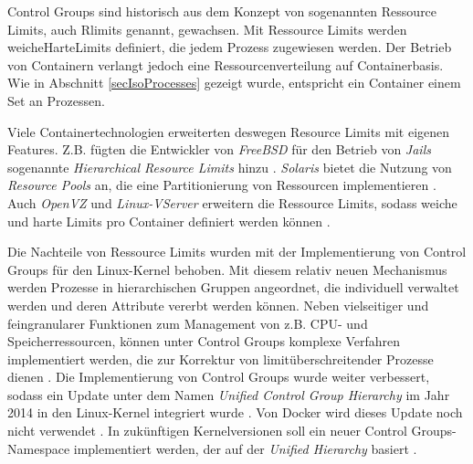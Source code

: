 \documentclass[../main.tex]{subfiles}
\begin{document}
		Control Groups sind historisch aus dem Konzept von sogenannten Ressource Limits, auch Rlimits genannt, gewachsen. Mit Ressource Limits werden \gls{weicheHarteLimits} definiert, die jedem Prozess zugewiesen werden. Der Betrieb von Containern verlangt jedoch eine Ressourcenverteilung auf Containerbasis. Wie in Abschnitt \ref{secIsoProcesses} gezeigt wurde, entspricht ein Container einem Set an Prozessen.


		Viele Containertechnologien erweiterten deswegen Resource Limits mit eigenen Features. Z.B. fügten die Entwickler von \emph{FreeBSD} für den Betrieb von \emph{Jails} sogenannte \emph{Hierarchical Resource Limits} hinzu \cite{freeBsdRCTL}. \emph{Solaris} bietet die Nutzung von \emph{Resource Pools} an, die eine Partitionierung von Ressourcen implementieren \cite{cgroupsUniHierarchyDoc}. Auch \emph{OpenVZ} und \emph{Linux-VServer} erweitern die Ressource Limits, sodass weiche und harte Limits pro Container definiert werden können \cite[S.15f.]{dockerSec2}.

		Die Nachteile von Ressource Limits wurden mit der Implementierung von Control Groups für den Linux-Kernel behoben. Mit diesem relativ neuen Mechanismus werden Prozesse in hierarchischen Gruppen angeordnet, die individuell verwaltet werden und deren Attribute vererbt werden können. Neben vielseitiger und feingranularer Funktionen zum Management von z.B. CPU- und Speicherressourcen, können unter Control Groups komplexe Verfahren implementiert werden, die zur Korrektur von limitüberschreitender Prozesse dienen \cite{cgroupsRedhat}. Die Implementierung von Control Groups wurde weiter verbessert, sodass ein Update unter dem Namen \emph{Unified Control Group Hierarchy} im Jahr 2014 in den Linux-Kernel integriert wurde \cite{cgroupsFixing}\cite{cgroupsUniHierarchy}. Von Docker wird dieses Update noch nicht verwendet \cite{githubCgroupsUniHierNotSupported}. In zukünftigen Kernelversionen soll ein neuer Control Groups-Namespace implementiert werden, der auf der \emph{Unified Hierarchy} basiert \cite{cgroupNs}.
\end{document}
